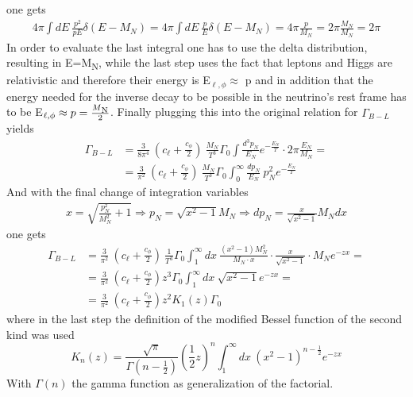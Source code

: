 one gets
\begin{align*}
	4\pi\int dE\: \frac{p^2}{pE}\delta\left(E-M_N\right)=4\pi\int dE\: \frac{p}{E}\delta\left(E-M_N\right)=4\pi\frac{p}{M_N}=2\pi \frac{M_N}{M_N}=2\pi
\end{align*}
In order to evaluate the last integral one has to use the delta distribution, resulting in E=M\textsubscript{N}, while the last step uses the fact that leptons and Higgs are relativistic and therefore their energy is E$_{\ell,\phi}\approx$ p and in addition that the energy needed for the inverse decay to be possible in the neutrino's rest frame has to be E$_{\ell,\phi}\approx p=\frac{M\textsubscript{N}}{2}$. Finally plugging this into the original relation for $\Gamma_{B-L}$ yields
\begin{align*}
	\Gamma_{B-L}&=\frac{3}{8\pi^4}\:\left(c_\ell+\frac{c_\phi}{2}\right)\:\frac{M_N}{T^3}\Gamma_0\int \frac{d^3p_N}{E_N}e^{-\frac{E_N}{T}} \cdot 2\pi\frac{E_N}{M_N}=\\
	&=\frac{3}{\pi^2}\:\left(c_\ell+\frac{c_\phi}{2}\right)\:\frac{M_N}{T^3}\Gamma_0\int_0^\infty \frac{dp_N}{E_N}\:p_N^2e^{-\frac{E_N}{T}}
\end{align*}
And with the final change of integration variables 
\begin{align*}
	x=\sqrt{\frac{p_N^2}{M_N^2}+1}\Longrightarrow p_N=\sqrt{x^2-1}M_N \Longrightarrow dp_N=\frac{x}{\sqrt{x^2-1}}M_Ndx
\end{align*}
one gets 
\begin{align*}
	\Gamma_{B-L}&=\frac{3}{\pi^2}\:\left(c_\ell+\frac{c_\phi}{2}\right)\:\frac{1}{T^3}\Gamma_0\int_{1}^{\infty}dx\: \frac{\left(x^2-1 \right)M_N^2}{M_N\cdot x}\cdot \frac{x}{\sqrt{x^2-1}}\cdot M_N e^{-zx}=\\
	&=\frac{3}{\pi^2}\:\left(c_\ell+\frac{c_\phi}{2}\right)z^3\Gamma_0\int_{1}^{\infty}dx\: \sqrt{x^2-1}e^{-zx}=\\
	&=\frac{3}{\pi^2}\:\left(c_\ell+\frac{c_\phi}{2}\right)z^2K_1(z)\Gamma_0
\end{align*}
where in the last step the definition of the modified Bessel function of the second kind was used
\begin{equation*}
	K_n(z)=\frac{\sqrt{\pi}}{\Gamma\left(n-\frac{1}{2}\right)}\left(\frac{1}{2}z\right)^n\int_{1}^{\infty}dx\:\left(x^2-1\right)^{n-\frac{1}{2}}e^{-zx}
\end{equation*}
With $\Gamma(n)$ the gamma function as generalization of the factorial.
\newpage
